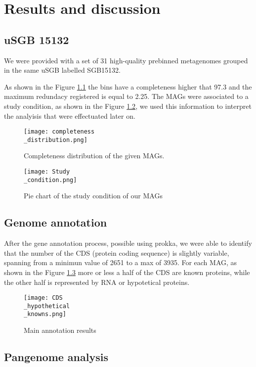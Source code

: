 \documentclass[a4paper,titlepage, oneside]{book}
\begin{document}
\chapter{Results and discussion}

\section{uSGB 15132}

We were provided with a set of 31 high-quality prebinned metagenomes grouped in the same uSGB labelled SGB15132.

As shown in the Figure \ref{fig:compl} the bins have a completeness higher that 97.3 and the maximum redundacy registered is equal to 2.25.
The MAGs were associated to a study condition, as shown in the Figure \ref{fig:studyCondition}, we used this information to interpret the analyisis that were effectuated later on.

\begin{figure}[ht]
\centering
\texttt{[image: completeness\\\_distribution.png]}
\caption{Completeness distribution of the given MAGs.}
\label{fig:compl}
\end{figure}


\begin{figure}[ht]
\centering
\texttt{[image: Study\\\_condition.png]}
\caption{Pie chart of the study condition of our MAGs}
\label{fig:studyCondition}
\end{figure}

\section{Genome annotation}
After the gene annotation process, possible using prokka, we were able to identify that the number of the CDS (protein coding sequence) is slightly variable, spanning from a minimun value of 2651 to a max of 3935. For each MAG, as shown in the Figure \ref{fig:CDS} more or less a half of the CDS are known proteins, while the other half is represented by RNA or hypotetical proteins.


\begin{figure}[ht]
\centering
\texttt{[image: CDS\\\_hypothetical\\\_knowns.png]}
\caption{Main annotation results}
\label{fig:CDS}
\end{figure}

\section{Pangenome analysis}
\end{document}
